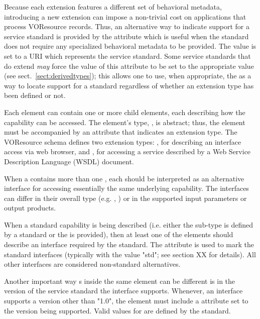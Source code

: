 \documentclass[11pt,a4paper]{ivoa}
\begin{document}
Because each  extension features a different
set of behavioral metadata, introducing a new
 extension can impose a non-trivial cost on
applications that process VOResource records.  Thus, an alternative
way to indicate support for a service standard is provided by the
 attribute which is useful when the standard
does not require any specialized behavioral metadata to be provided.
The value is set to a URI which represents the service standard.  Some
service standards that do extend 
\emph{may} force the value of this attribute to be set to the
appropriate value (see sect.~\ref{sect:derivedtypes});
this allows one to use, when appropriate, the 
as a way to locate support for a standard regardless of whether an
extension type has been defined or not.   



Each  element can contain one or more child
 elements, each describing how the capability
can be accessed.  The  element's type,
, is abstract; thus, the
 element must be accompanied by an
 attribute that indicates an
 extension type.  The VOResource schema
defines two  extension types:
, for describing an interface access via web
browser, and , for accessing a service
described by a Web Service Description Language (WSDL) document.


When a  contains more than one
, each  should be
interpreted as an alternative interface for accessing essentially the
same underlying capability.  The interfaces can differ in their
overall type (e.g. ,
) or in the supported input parameters or
output products.  


When a standard capability is being described (i.e. either the
 sub-type is defined by a standard or the
 is provided), then at least one of the
 elements should describe an interface required
by the standard.  The  attribute is used to mark the
standard interfaces (typically with the value "std"; see section XX
for details).  All other interfaces are considered non-standard
alternatives.



Another important way s inside the same
 element can be different is in the version of
the service standard the interface supports.  Whenever, an interface
supports a version other than "1.0", the 
element must include a  attribute set to the
version being supported.  Valid values for  are
defined by the standard.  
\end{document}
